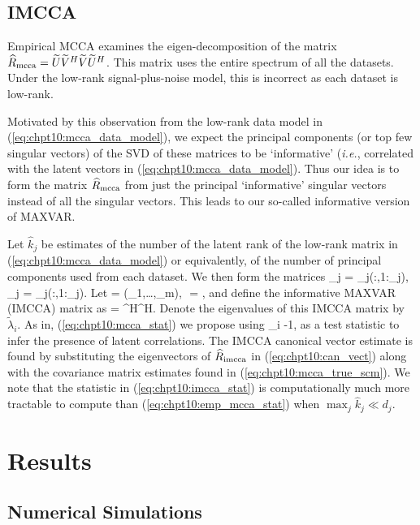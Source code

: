 \subsection{IMCCA}

Empirical MCCA examines the eigen-decomposition of the matrix $\widehat{R}_{\text{mcca}} =
\widetilde{U}\widetilde{V}^H\widetilde{V}\widetilde{U}^H$. This matrix uses the entire
spectrum of all the datasets. Under the low-rank
signal-plus-noise model, this is incorrect as each dataset is low-rank.

Motivated by this observation from the low-rank data model in
(\ref{eq:chpt10:mcca_data_model}), we expect the principal components (or top few singular
vectors) of the SVD of these matrices to be `informative' (\textit{i.e.}, correlated with
the latent vectors in (\ref{eq:chpt10:mcca_data_model}). Thus our idea is to form the
matrix $\widehat{R}_{\text{mcca}}$ from just the principal `informative' singular vectors instead of all
the singular vectors. This leads to our so-called informative version of MAXVAR.

Let $\widehat{k}_j$ be estimates of the number of the latent rank of the low-rank matrix in (\ref{eq:chpt10:mcca_data_model})  or equivalently, of the number of principal components used from each dataset. We then form the matrices
\be
\Ucir_j = _j\left(:,1:_j\right),\,\Vcir_j = _j\left(:,1:_j\right).
\ee
Let
\be
\Ucir = \blkdiag(\Ucir_1,\dots,\Ucir_m),\,\,\,\,\Vcir =
,
\ee
and define the informative MAXVAR (IMCCA) matrix as
\beq\label{eq:chpt10:rimcca}
\Rmccatil = \Ucir\Vcir^H\Vcir\Ucir^H.
\eeq
Denote the eigenvalues of this IMCCA matrix by $\widetilde{\lambda}_i$. As in,
(\ref{eq:chpt10:mcca_stat}) we propose using
\beq\label{eq:chpt10:imcca_stat}
\widetilde{\lambda}_i -1,
\eeq
as a test statistic to infer the presence of latent correlations. The IMCCA canonical
vector estimate is found by substituting the eigenvectors of $\widehat{R}_{\text{imcca}}$ in
(\ref{eq:chpt10:can_vect}) along with the covariance matrix estimates found in
(\ref{eq:chpt10:mcca_true_scm}). We note that the statistic in
(\ref{eq:chpt10:imcca_stat}) is computationally much more tractable to compute than
(\ref{eq:chpt10:emp_mcca_stat}) when $\max_{j} \widehat{k}_{j} \ll d_j$.

\section{Results}\label{sec:results}

\subsection{Numerical Simulations}\label{sec:num_sims}

